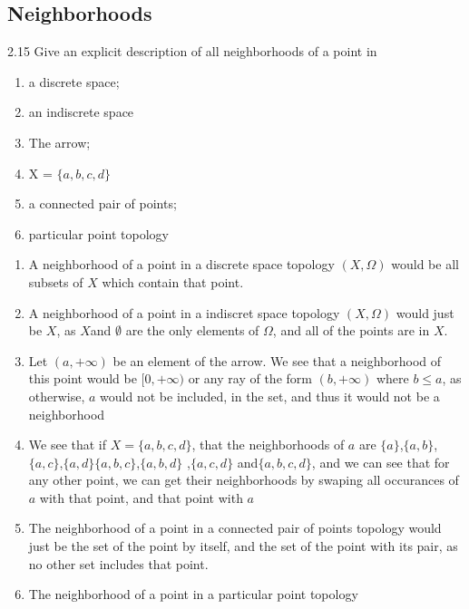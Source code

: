 \subsection{Neighborhoods}
2.15 Give an explicit description of all neighborhoods of a point in
\begin{enumerate}
\item a discrete space;
\item an indiscrete space
\item The arrow;
\item X = $\{a,b,c,d\}$
\item a connected pair of points;
\item particular point topology
\end{enumerate}

\begin{enumerate}
  \item A neighborhood of a point in a discrete space topology $(X,\Omega)$ would
    be all subsets of $X$ which contain that point.
  \item A neighborhood of a point in a indiscret space topology
    $(X,\Omega)$ would just be $X$, as $X$and $\emptyset$ are the only
    elements of $\Omega$, and all of the points are in $X$.
  \item Let $(a,+\infty)$ be an element of the arrow. We see that a
    neighborhood of this point would be $[0,+\infty)$ or any ray of the form
    $(b,+\infty)$ where $b\leq a$, as otherwise, $a$ would not be
    included, in the set, and thus it would not be a neighborhood
  \item We see that if $X = \{a,b,c,d\}$, that the neighborhoods of
    $a$ are
    $\{a\}$,$\{a,b\}$,$\{a,c\}$,$\{a,d\}$$\{a,b,c\}$,$\{a,b,d\}$
    ,$\{a,c,d\}$  and$\{a,b,c,d\}$, and we can see that for any other
    point, we can get their neighborhoods by swaping all occurances of
    $a$ with that point, and that point with $a$
  \item The neighborhood of a point in a connected pair of points
    topology would just be the set of the point by itself, and the set
    of the point with its pair, as no other set includes that point.
  \item The neighborhood of a point in a particular point topology
\end{enumerate}